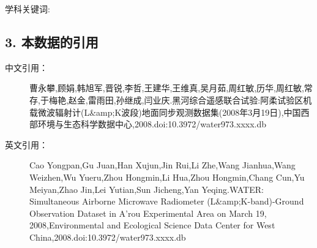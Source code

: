 \documentclass[letterpaper,10pt,english]{sphinxmanual}
\begin{document}
学科关键词:


\subsection{3. 本数据的引用}
\label{fecd46b0-3390-4580-a415-2d49ba77f9bd:id3}\begin{description}
\item[{中文引用：}] \leavevmode
曹永攀,顾娟,韩旭军,晋锐,李哲,王建华,王维真,吴月茹,周红敏,历华,周红敏,常存,于梅艳,赵金,雷雨田,孙继成,闫业庆.黑河综合遥感联合试验:阿柔试验区机载微波辐射计(L\&amp;K波段)地面同步观测数据集(2008年3月19日),中国西部环境与生态科学数据中心,2008.doi:10.3972/water973.xxxx.db

\item[{英文引用：}] \leavevmode
Cao Yongpan,Gu Juan,Han Xujun,Jin Rui,Li Zhe,Wang Jianhua,Wang Weizhen,Wu Yueru,Zhou Hongmin,Li Hua,Zhou Hongmin,Chang Cun,Yu Meiyan,Zhao Jin,Lei Yutian,Sun Jicheng,Yan Yeqing.WATER: Simultaneous Airborne Microwave Radiometer (L\&amp;K-band)-Ground Observation Dataset in A'rou Experimental Area on March 19, 2008,Environmental and Ecological Science Data Center for West China,2008.doi:10.3972/water973.xxxx.db

\end{description}
\end{document}
